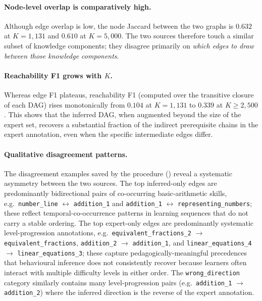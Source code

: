 \documentclass[runningheads]{llncs}
\newcommand{\KCs}{knowledge components}
\begin{document}
\paragraph{Node-level overlap is comparatively high.}
Although edge overlap is low, the node Jaccard between the two graphs
is $0.632$ at $K=1{,}131$ and $0.610$ at $K=5{,}000$. The two sources
therefore touch a similar subset of \KCs{}; they disagree primarily on
\emph{which edges to draw between those \KCs{}}.

\paragraph{Reachability F1 grows with $K$.}
Whereas edge F1 plateaus, reachability F1 (computed over the transitive
closure of each DAG) rises monotonically from $0.104$ at $K=1{,}131$
to $0.339$ at $K \geq 2{,}500$. This shows that the inferred DAG, when
augmented beyond the size of the expert set, recovers a substantial
fraction of the indirect prerequisite chains in the expert annotation,
even when the specific intermediate edges differ.

\paragraph{Qualitative disagreement patterns.}
The disagreement examples saved by the procedure
() reveal a
systematic asymmetry between the two sources.
The top inferred-only edges are predominantly bidirectional pairs of
co-occurring basic-arithmetic skills, e.g.\ \texttt{number\_line}
$\leftrightarrow$ \texttt{addition\_1} and \texttt{addition\_1}
$\leftrightarrow$ \texttt{representing\_numbers}; these reflect
temporal-co-occurrence patterns in learning sequences that do not
carry a stable ordering.
The top expert-only edges are predominantly systematic
level-progression annotations, e.g.\ \texttt{equivalent\_fractions\_2}
$\rightarrow$ \texttt{equivalent\_fractions}, \texttt{addition\_2}
$\rightarrow$ \texttt{addition\_1}, and
\texttt{linear\_equations\_4} $\rightarrow$ \texttt{linear\_equations\_3};
these capture pedagogically-meaningful precedences that behavioural
inference does not consistently recover because learners often interact
with multiple difficulty levels in either order.
The \texttt{wrong\_direction} category similarly contains many
level-progression pairs (e.g.\ \texttt{addition\_1} $\rightarrow$
\texttt{addition\_2}) where the inferred direction is the reverse of
the expert annotation.
\end{document}
